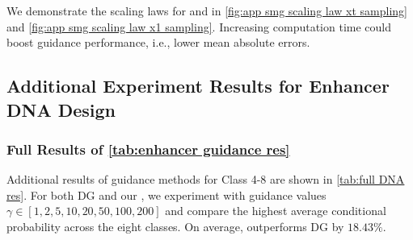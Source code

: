 We demonstrate the scaling laws for \xtsampling and \xcleansampling in \cref{fig:app smg scaling law xt sampling} and \cref{fig:app smg scaling law x1 sampling}. Increasing computation time could boost guidance performance, i.e., lower mean absolute errors.





\subsection{Additional Experiment Results for Enhancer DNA Design}
\subsubsection{Full Results of \cref{tab:enhancer guidance res}}
Additional results of guidance methods for Class 4-8 are shown in \cref{tab:full DNA res}.
For both DG and our \xtgrad, we experiment with guidance values $\gamma \in [1, 2, 5, 10, 20, 50, 100, 200]$ and compare the highest average conditional probability across the eight classes. On average, \xtgrad outperforms DG by $18.43\%$. 



